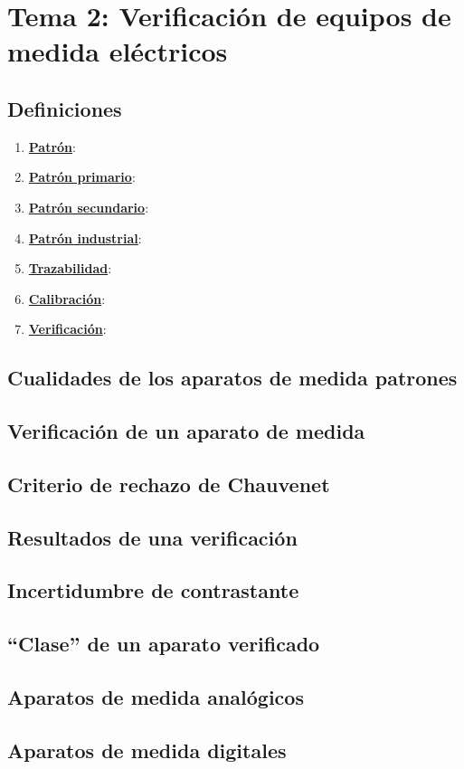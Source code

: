 \section{Tema 2: Verificación de equipos de medida eléctricos}
\subsection{Definiciones}
\begin{enumerate}
	\item \underline{\textbf{Patrón}}: 
	\item \underline{\textbf{Patrón primario}}: 
	\item \underline{\textbf{Patrón secundario}}: 
	\item \underline{\textbf{Patrón industrial}}: 
	\item \underline{\textbf{Trazabilidad}}: 
	\item \underline{\textbf{Calibración}}: 
	\item \underline{\textbf{Verificación}}: 
\end{enumerate}
\subsection{Cualidades de los aparatos de medida patrones}
\subsection{Verificación de un aparato de medida}
\subsection{Criterio de rechazo de Chauvenet}
\subsection{Resultados de una verificación}
\subsection{Incertidumbre de contrastante}
\subsection{“Clase” de un aparato verificado}
\subsection{Aparatos de medida analógicos}
\subsection{Aparatos de medida digitales}